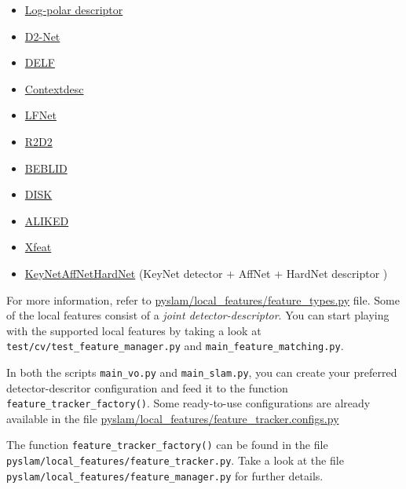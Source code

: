 \documentclass{article}
\begin{document}
\begin{itemize}
    \item \href{https://github.com/cvlab-epfl/log-polar-descriptors}{Log-polar descriptor} \cite{LogPolarDescriptor}
    \item \href{https://github.com/mihaidusmanu/d2-net}{D2-Net} \cite{dusmanu2019d2}
    \item \href{https://github.com/tensorflow/models/tree/master/research/delf}{DELF} \cite{noh2017large}
    \item \href{https://github.com/lzx551402/contextdesc}{Contextdesc} \cite{luo2020contextdesc}
    \item \href{https://github.com/vcg-uvic/lf-net-release}{LFNet} \cite{ono2018lf}
    \item \href{https://github.com/naver/r2d2}{R2D2} \cite{revaud2019r2d2}
    \item \href{https://raw.githubusercontent.com/iago-suarez/BEBLID/master/BEBLID_Boosted_Efficient_Binary_Local_Image_Descriptor.pdf}{BEBLID} \cite{BEBLID}
    \item \href{https://arxiv.org/abs/2006.13566}{DISK} \cite{tyszkiewicz2020disk}
    \item \href{https://arxiv.org/abs/2304.03608}{ALIKED} \cite{barroso2023alike}
    \item \href{https://arxiv.org/abs/2404.19174}{Xfeat} \cite{barroso2024xfeat}
    \item \href{https://github.com/axelBarroso/Key.Net}{KeyNetAffNetHardNet} (KeyNet detector \cite{barroso2020key} + AffNet + HardNet descriptor \cite{mishchuk2017working})
\end{itemize}

For more information, refer to \href{https://github.com/luigifreda/pyslam/blob/master/pyslam/local_features/feature_types.py}{pyslam/local\_features/feature\_types.py}
file. Some of the local features consist of a \emph{joint
detector-descriptor}. You can start playing with the supported local
features by taking a look at \texttt{test/cv/test\_feature\_manager.py}
and \texttt{main\_feature\_matching.py}.

In both the scripts \texttt{main\_vo.py} and \texttt{main\_slam.py}, you
can create your preferred detector-descritor configuration and feed it
to the function \texttt{feature\_tracker\_factory()}. Some ready-to-use
configurations are already available in the file
\href{https://github.com/luigifreda/pyslam/blob/master/pyslam/local_features/feature_tracker_configs.py}{pyslam/local\_features/feature\_tracker.configs.py}

The function \texttt{feature\_tracker\_factory()} can be found in the
file \texttt{pyslam/local\_features/feature\_tracker.py}. Take a look at the
file \texttt{pyslam/local\_features/feature\_manager.py} for further details.
\end{document}
